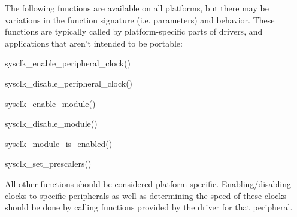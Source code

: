 The following functions are available on all platforms, but there may be variations in the function signature (i.\-e. parameters) and behavior. These functions are typically called by platform-\/specific parts of drivers, and applications that aren't intended to be portable\-:
\begin{DoxyItemize}
\item sysclk\-\_\-enable\-\_\-peripheral\-\_\-clock()
\item sysclk\-\_\-disable\-\_\-peripheral\-\_\-clock()
\item sysclk\-\_\-enable\-\_\-module()
\item sysclk\-\_\-disable\-\_\-module()
\item sysclk\-\_\-module\-\_\-is\-\_\-enabled()
\item sysclk\-\_\-set\-\_\-prescalers()
\end{DoxyItemize}

All other functions should be considered platform-\/specific. Enabling/disabling clocks to specific peripherals as well as determining the speed of these clocks should be done by calling functions provided by the driver for that peripheral. 